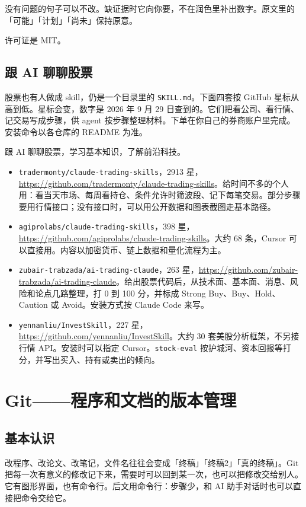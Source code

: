 没有问题的句子可以不改。缺证据时它向你要，不在润色里补出数字。原文里的「可能」「计划」「尚未」保持原意。

许可证是 MIT。


\section{跟 AI 聊聊股票}
股票也有人做成 skill，仍是一个目录里的 \verb|SKILL.md|。下面四套按 GitHub 星标从高到低。星标会变，数字是 2026 年 9 月 29 日查到的。它们把看公司、看行情、记交易写成步骤，供 agent 按步骤整理材料。下单在你自己的券商账户里完成。安装命令以各仓库的 README 为准。

\begin{xiaonao}
跟 AI 聊聊股票，学习基本知识，了解前沿科技。
\end{xiaonao}

\begin{itemize}
\item \verb|tradermonty/claude-trading-skills|，2913 星，\url{https://github.com/tradermonty/claude-trading-skills}。给时间不多的个人用：看当天市场、每周看持仓、条件允许时筛波段、记下每笔交易。部分步骤要用行情接口；没有接口时，可以用公开数据和图表截图走基本路径。
\item \verb|agiprolabs/claude-trading-skills|，398 星，\url{https://github.com/agiprolabs/claude-trading-skills}。大约 68 条，Cursor 可以直接用。内容以加密货币、链上数据和量化流程为主。
\item \verb|zubair-trabzada/ai-trading-claude|，263 星，\url{https://github.com/zubair-trabzada/ai-trading-claude}。给出股票代码后，从技术面、基本面、消息、风险和论点几路整理，打 0 到 100 分，并标成 Strong Buy、Buy、Hold、Caution 或 Avoid。安装方式按 Claude Code 来写。
\item \verb|yennanliu/InvestSkill|，227 星，\url{https://github.com/yennanliu/InvestSkill}。大约 30 套美股分析框架，不另接行情 API。安装时可以指定 Cursor。\verb|stock-eval| 按护城河、资本回报等打分，并写出买入、持有或卖出的倾向。
\end{itemize}



\chapter{Git——程序和文档的版本管理}
\section{基本认识}
改程序、改论文、改笔记，文件名往往会变成「终稿」「终稿2」「真的终稿」。Git 把每一次有意义的修改记下来，需要时可以回到某一次，也可以把修改交给别人。它有图形界面，也有命令行。后文用命令行：步骤少，和 AI 助手对话时也可以直接把命令交给它。

